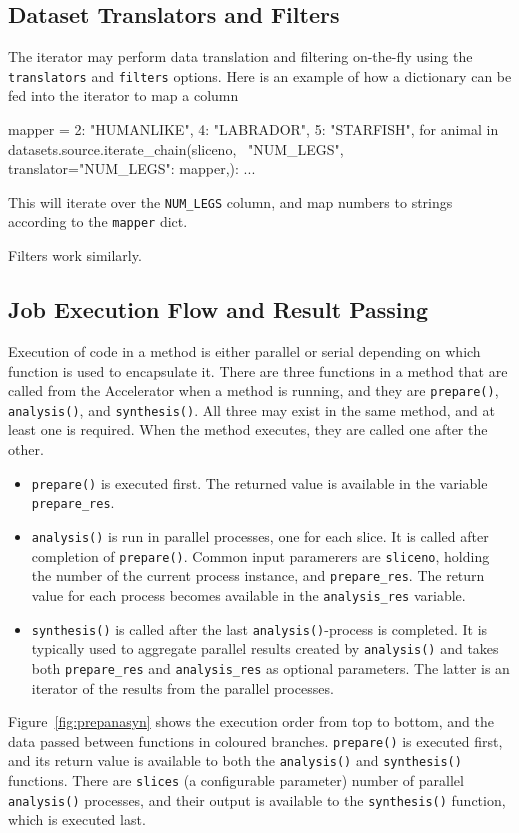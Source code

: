 \subsection{Dataset Translators and Filters}

The iterator may perform data translation and filtering on-the-fly
using the \texttt{translators} and \texttt{filters} options.  Here is
an example of how a dictionary can be fed into the iterator to map a
column
\begin{python}
mapper = {2: "HUMANLIKE", 4: "LABRADOR", 5: "STARFISH",}
for animal in datasets.source.iterate_chain(sliceno, \
  "NUM_LEGS", translator={"NUM_LEGS": mapper,}):
    ...
\end{python}
This will iterate over the \texttt{NUM\_LEGS} column, and map numbers
to strings according to the \texttt{mapper} dict.

Filters work similarly.



\subsection{Job Execution Flow and Result Passing}

Execution of code in a method is either parallel or serial depending
on which function is used to encapsulate it.  There are three
functions in a method that are called from the Accelerator when a
method is running, and they are \texttt{prepare()},
\texttt{analysis()}, and \texttt{synthesis()}.  All three may exist in
the same method, and at least one is required.  When the method
executes, they are called one after the other.
\begin{itemize}
\item[] \texttt{prepare()} is executed first.  The returned value is
  available in the variable \texttt{prepare\_res}.
\item[] \texttt{analysis()} is run in parallel processes, one for each
  slice.  It is called after completion of \texttt{prepare()}.  Common
  input paramerers are \texttt{sliceno}, holding the number of the
  current process instance, and \texttt{prepare\_res}.  The return
  value for each process becomes available in the
  \texttt{analysis\_res} variable.
\item[] \texttt{synthesis()} is called after the last
  \texttt{analysis()}-process is completed.  It is typically used to
  aggregate parallel results created by \texttt{analysis()} and takes
  both \texttt{prepare\_res} and \texttt{analysis\_res} as optional
  parameters.  The latter is an iterator of the results from the
  parallel processes.
\end{itemize}
Figure~\ref{fig:prepanasyn} shows the execution order from top to
bottom, and the data passed between functions in coloured branches.
\texttt{prepare()} is executed first, and its return value is
available to both the \texttt{analysis()} and \texttt{synthesis()}
functions.  There are \texttt{slices} (a configurable parameter)
number of parallel \texttt{analysis()} processes, and their output is
available to the \texttt{synthesis()} function, which is executed
last.

